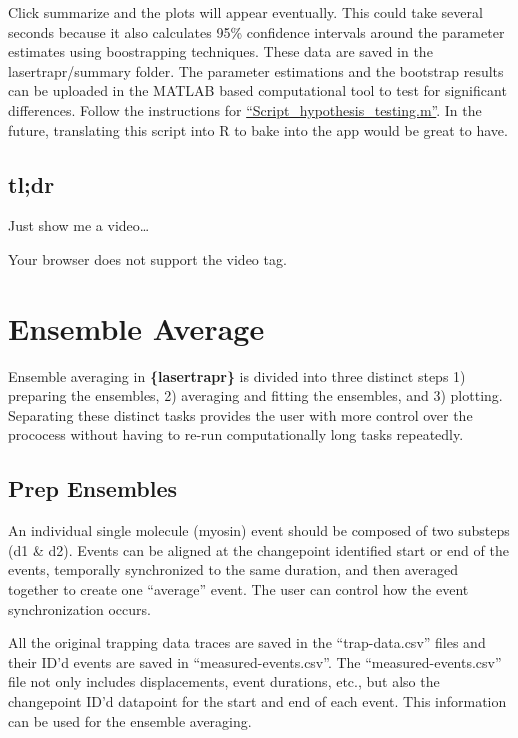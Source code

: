 \documentclass[
]{book}
\begin{document}
Click summarize and the plots will appear eventually. This could take several seconds because it also calculates 95\% confidence intervals around the parameter estimates using boostrapping techniques. These data are saved in the lasertrapr/summary folder. The parameter estimations and the bootstrap results can be uploaded in the MATLAB based computational tool to test for significant differences. Follow the instructions for \href{https://github.com/GreenbergLab/Thin_Filament_Fitting}{``Script\_hypothesis\_testing.m''}. In the future, translating this script into R to bake into the app would be great to have.

\section{tl;dr}\label{tldr-2}

Just show me a video\ldots{}

Your browser does not support the video tag.

\chapter{Ensemble Average}\label{ensemble-average}

Ensemble averaging in \textbf{\{lasertrapr\}} is divided into three distinct steps 1) preparing the ensembles, 2) averaging and fitting the ensembles, and 3) plotting. Separating these distinct tasks provides the user with more control over the prococess without having to re-run computationally long tasks repeatedly.

\section{Prep Ensembles}\label{prep-ensembles}

An individual single molecule (myosin) event should be composed of two substeps (d1 \& d2). Events can be aligned at the changepoint identified start or end of the events, temporally synchronized to the same duration, and then averaged together to create one ``average'' event. The user can control how the event synchronization occurs.

All the original trapping data traces are saved in the ``trap-data.csv'' files and their ID'd events are saved in ``measured-events.csv''. The ``measured-events.csv'' file not only includes displacements, event durations, etc., but also the changepoint ID'd datapoint for the start and end of each event. This information can be used for the ensemble averaging.
\end{document}
